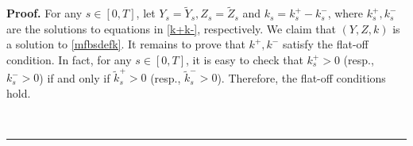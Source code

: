 \documentclass[10pt]{article}%
\numberwithin{equation}{section}
\newenvironment{proof}[1][Proof]{\noindent \textbf{#1.} }{\  \rule{0.5em}{0.5em}}
\begin{document}
\begin{proof}
For any $s\in[0,T]$, let $Y_s=\widetilde{Y}_s, Z_s=\widetilde{Z}_s$ and $k_s=k^+_s-k^-_s$, where $k^+_s,k^-_s$ are the solutions to equations in \eqref{k+k-}, respectively. We claim that $(Y,Z,k)$ is a solution to \eqref{mfbsdefk}. It remains to prove that $k^+,k^-$ satisfy the flat-off condition. In fact, for any $s\in [0,T]$, it is easy to check that $k^+_s>0$ (resp., $k^-_s>0$) if and only if $\widetilde{k}^+_s>0$ (resp., $\widetilde{k}^-_s>0$). Therefore, the flat-off conditions hold. 

\end{proof}
\end{document}
